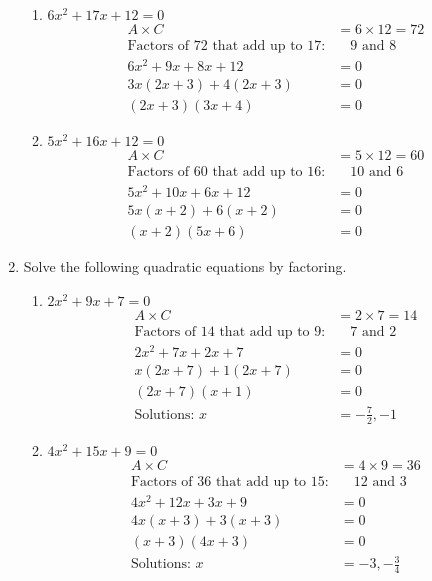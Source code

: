 \documentclass[12pt]{article}
\begin{document}
\begin{enumerate}
\begin{enumerate}
        \item $6x^2 + 17x + 12 = 0$
        \begin{align*}
            A \times C & = 6 \times 12 = 72 \\
            \text{Factors of 72 that add up to 17:} & \quad 9 \text{ and } 8 \\
            6x^2 + 9x + 8x + 12 &= 0 \\
            3x(2x + 3) + 4(2x + 3) &= 0 \\
            (2x + 3)(3x + 4) &= 0
        \end{align*}
        
        \item $5x^2 + 16x + 12 = 0$
        \begin{align*}
            A \times C & = 5 \times 12 = 60 \\
            \text{Factors of 60 that add up to 16:} & \quad 10 \text{ and } 6 \\
            5x^2 + 10x + 6x + 12 &= 0 \\
            5x(x + 2) + 6(x + 2) &= 0 \\
            (x + 2)(5x + 6) &= 0
        \end{align*}
    \end{enumerate}

    \item Solve the following quadratic equations by factoring.
    \begin{enumerate}
        \item $2x^2 + 9x + 7 = 0$
        \begin{align*}
            A \times C & = 2 \times 7 = 14 \\
            \text{Factors of 14 that add up to 9:} & \quad 7 \text{ and } 2 \\
            2x^2 + 7x + 2x + 7 &= 0 \\
            x(2x + 7) + 1(2x + 7) &= 0 \\
            (2x + 7)(x + 1) &= 0 \\
            \text{Solutions: } x &= -\frac{7}{2}, -1
        \end{align*}
        
        \item $4x^2 + 15x + 9 = 0$
        \begin{align*}
            A \times C & = 4 \times 9 = 36 \\
            \text{Factors of 36 that add up to 15:} & \quad 12 \text{ and } 3 \\
            4x^2 + 12x + 3x + 9 &= 0 \\
            4x(x + 3) + 3(x + 3) &= 0 \\
            (x + 3)(4x + 3) &= 0 \\
            \text{Solutions: } x &= -3, -\frac{3}{4}
        \end{align*}
        

\end{enumerate}
\end{enumerate}
\end{document}
